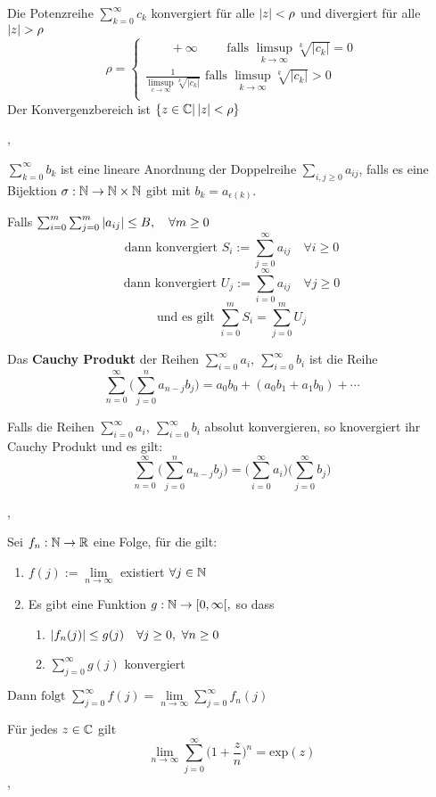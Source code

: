 \Korollar[2.7.21] Die Potenzreihe $\sum_{k=0}^{\infty} c_{k}$ konvergiert für alle $\left\lvert z \right\rvert < \rho$ und divergiert für alle $\left\lvert z \right\rvert > \rho$
\[\rho =\begin{cases}
\quad \quad + \infty \quad \quad \text{ falls } \limsup\limits_{k \rightarrow \infty} \sqrt[k]{\left|c_{k}\right|} = 0 \\
\frac{1}{\limsup\limits_{c \rightarrow \infty} \sqrt[k]{\left|c_{k}\right|}}  \text{ falls } \limsup\limits_{k \rightarrow \infty} \sqrt[k]{\left|c_{k}\right|} > 0 \\
\end{cases}\]
\Bem Der Konvergenzbereich ist $\{z \in  \mathbb{C} | \left\lvert z \right\rvert < \rho\}$

\sep

\Def[2.7.22] $\sum_{k=0}^{\infty} b_{k}$ ist eine lineare Anordnung der Doppelreihe $\sum_{i,j \geq 0} a_{ij}$, falls es eine Bijektion $\sigma : \mathbb{N} \rightarrow \mathbb{N} \times \mathbb{N}$ gibt mit $b_k = a_{\epsilon(k)}$.

\Satz[2.7.23] Falls $\sum_{i=0}^{m}\sum_{j=0}^{m}\left\lvert a_{ij} \right\rvert \leq B, \quad \forall m \geq 0$
\[ \text{dann konvergiert } S_{i} := \sum_{j=0}^{\infty} a_{ij} \quad \forall i \geq 0 \]
\[ \text{dann konvergiert } U_{j} := \sum_{i=0}^{\infty} a_{ij} \quad \forall j \geq 0 \]
\[ \text{und es gilt } \sum_{i=0}^{m} S_{i} = \sum_{j=0}^{m} U_{j} \]

\Satz[2.7.24] Das \textbf{Cauchy Produkt} der Reihen $\sum_{i=0}^{\infty} a_i, \ \sum_{i=0}^{\infty} b_i$ ist die Reihe
\[\sum_{n=0}^\infty \Bigg(\sum_{j=0}^{n} a_{n-j} b_{j} \Bigg) = a_0 b_0 + (a_0 b_1 + a_1 b_0) + \cdots  \]

\Satz[2.7.26] Falls die Reihen $\sum_{i=0}^{\infty} a_i, \ \sum_{i=0}^{\infty} b_i$ absolut konvergieren, so knovergiert ihr Cauchy Produkt und es gilt:
\[\sum_{n=0}^\infty \Bigg(\sum_{j=0}^{n} a_{n-j} b_{j} \Bigg) = \Bigg( \sum_{i=0}^\infty a_i \Bigg) \Bigg(\sum_{j=0}^\infty b_j \Bigg) \]

\sep

\Satz[2.7.28] Sei $f_n : \mathbb{N} \rightarrow \mathbb{R}$ eine Folge, für die gilt:
\begin{enumerate}
\item[(1)] $ f(j) :=  \lim\limits_{n \rightarrow \infty}$ existiert $\forall j \in \mathbb{N}$ 
\item[(2)] Es gibt eine Funktion $g : \mathbb{N} \rightarrow [0, \infty[,$ so dass
\begin{enumerate}
\item[(2.1)] $\left\lvert f_n(j) \right\rvert \leq g(j) \quad \forall j \geq 0, \ \forall n \geq 0$
\item[(2.2)] $\sum_{j=0}^{\infty} g(j)$ konvergiert
\end{enumerate}
\end{enumerate}

\( \text{Dann folgt } \sum_{j=0}^{\infty} f(j) =  \lim\limits_{n \rightarrow \infty} \sum_{j=0}^{\infty} f_n(j) \)

\Korollar[2.7.29] Für jedes $z \in \mathbb{C}$ gilt
\[\lim\limits_{n \rightarrow \infty} \sum_{j=0}^{\infty} \bigg(1 + \frac{z}{n} \bigg)^n = \text{exp}(z) \]
\sep